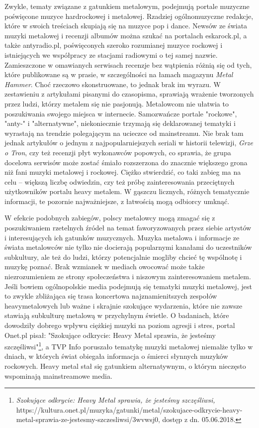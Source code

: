 \documentclass[12pt, a4paper, titlepage]{report}
\begin{document}
Zwykle, tematy związane z gatunkiem metalowym, podejmują portale muzyczne poświęcone muzyce hardrockowej i metalowej. Rzadziej ogólnomuzyczne redakcje, które w swoich treściach skupiają się na muzyce pop i dance. Newsów ze świata muzyki metalowej i recenzji albumów można szukać na portalach eskarock.pl, a także antyradio.pl, poświęconych szeroko rozumianej muzyce rockowej i istniejących we współpracy ze stacjami radiowymi o tej samej nazwie. Zamieszczone w omawianych serwisach recenzje bez wątpienia różnią się od tych, które publikowane są w prasie, w szczególności na łamach magazynu \textit{Metal Hammer}. Choć rzeczowo skonstruowane, to jednak brak im wyrazu. W zestawieniu z artykułami pisanymi do czasopisma, sprawiają wrażenie tworzonych przez ludzi, którzy metalem się nie pasjonują. Metalowcom nie ułatwia to poszukiwania swojego miejsca w internecie. Samozwańcze portale "rockowe", "anty-" i "alternatywne", niekoniecznie trzymają się deklarowanej tematyki i wyrastają na trendzie polegającym na ucieczce od mainstreamu. Nie brak tam jednak artykułów o jednym z najpopularniejszych seriali w historii telewizji, \textit{Grze o Tron}, czy też recenzji płyt wykonawców popowych, co sprawia, że grupa docelowa serwisów może zostać śmiało rozszerzona do znacznie większego grona niż fani muzyki metalowej i rockowej. Ciężko stwierdzić, co taki zabieg ma na celu -- większą liczbę odwiedzin, czy też próbę zainteresowania przeciętnych użytkowników portalu heavy metalem. W gąszczu licznych, różnych tematycznie informacji, te pozornie najważniejsze, z łatwością mogą odbiorcy umknąć.

W efekcie podobnych zabiegów, polscy metalowcy mogą zmagać się z poszukiwaniem rzetelnych źródeł na temat faworyzowanych przez siebie artystów i interesujących ich gatunków muzycznych. Muzyka metalowa i informacje ze świata metalowców nie tylko nie docierają popularnymi kanałami do uczestników subkultury, ale też do ludzi, którzy potencjalnie mogliby chcieć tę wspólnotę i muzykę poznać. Brak wzmianek w mediach owocować może także niezrozumieniem ze strony społeczeństwa i niszowym zainteresowaniem metalem. Jeśli bowiem ogólnopolskie media podejmują się tematyki muzyki metalowej, jest to zwykle zbliżająca się trasa koncertowa najznamienitszych zespołów heavymetalowych lub ważne i skrajnie szokujące wydarzenia, które nie zawsze stawiają subkulturę metalową w przychylnym świetle. O badaniach, które dowodziły dobrego wpływu ciężkiej muzyki na poziom agresji i stres, portal Onet.pl pisał: "Szokujące odkrycie: Heavy Metal sprawia, że jesteśmy szczęśliwsi"\footnote{\textit{Szokujące odkrycie: Heavy Metal sprawia, że jesteśmy szczęśliwsi,} https://kultura.onet.pl/muzyka/gatunki/metal/szokujace-odkrycie-heavy-metal-sprawia-ze-jestesmy-szczesliwsi/3wvwsj0, dostęp z dn. 05.06.2018.}, a TVP Info poruszało tematykę muzyki metalowej niemalże tylko w dniach, w których świat obiegała informacja o śmierci słynnych muzyków rockowych. Heavy metal stał się gatunkiem alternatywnym, o którym nieczęsto wspominają mainstreamowe media. 
\end{document}
